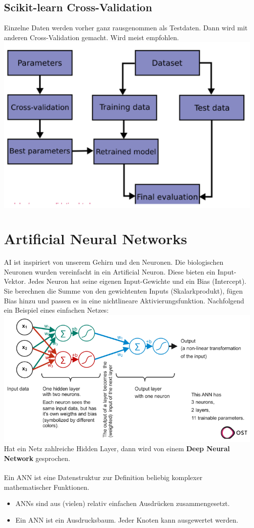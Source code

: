 \subsection{Scikit-learn Cross-Validation}
Einzelne Daten werden vorher ganz rausgenommen als Testdaten. Dann wird mit anderen Cross-Validation gemacht. Wird meist empfohlen.
\includegraphics[width=\linewidth]{img/scikit-cross-validation.png}
\section{Artificial Neural Networks}
AI ist inspiriert von unserem Gehirn und den Neuronen. Die biologischen Neuronen wurden vereinfacht in ein Artificial Neuron. Diese bieten ein Input-Vektor. Jedes Neuron hat seine eigenen Input-Gewichte und ein Bias (Intercept). Sie berechnen die Summe von den gewichtenten Inputs (Skalarkprodukt), fügen Bias hinzu und passen es in eine nichtlineare Aktivierungsfunktion. Nachfolgend ein Beispiel eines einfachen Netzes:
\includegraphics[width=\linewidth]{img/neural-network.png}
Hat ein Netz zahlreiche Hidden Layer, dann wird von einem \textbf{Deep Neural Network} gesprochen.\\
\\
Ein ANN ist eine Datenstruktur zur Definition beliebig komplexer mathematischer Funktionen.
\begin{itemize}
\item ANNs sind aus (vielen) relativ einfachen Ausdrücken zusammengesetzt.
\item Ein ANN ist ein Ausdrucksbaum. Jeder Knoten kann ausgewertet werden.
\end{itemize}

